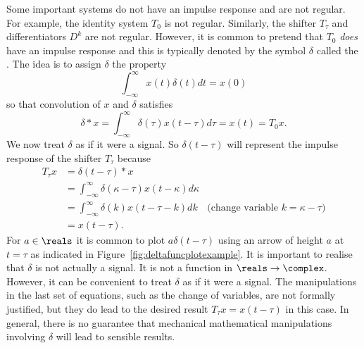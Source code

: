 Some important systems do not have an impulse response and are not regular.  For example, the identity system $T_0$ is not regular.  %
Similarly, the  shifter $T_\tau$ and differentiators $D^k$ are not regular.  However, it is common to pretend that $T_0$ \emph{does} have an impulse response and this is typically denoted by the symbol $\delta$ called the .  The idea is to assign $\delta$ the property
\[
\int_{-\infty}^\infty x(t) \delta(t) dt = x(0) %
\]
so that convolution of $x$ and $\delta$ satisfies
\[
\delta * x = \int_{-\infty}^{\infty} \delta(\tau) x(t - \tau) d\tau = x(t) = T_0 x .
\]
We now treat $\delta$ as if it were a signal.  So $\delta(t - \tau)$ will represent the impulse response of the shifter $T_\tau$ because
\begin{align*}
T_\tau x &= \delta(t - \tau) * x \\
&= \int_{-\infty}^{\infty} \delta(\kappa -\tau) x(t - \kappa) d\kappa \\
&= \int_{-\infty}^{\infty} \delta(k) x(t - \tau - k) dk & \text{(change variable $k = \kappa - \tau$)}\\
&= x(t-\tau).
\end{align*}
For $a \in \reals$ it is common to plot $a\delta(t - \tau)$ using an arrow of height $a$ at $t = \tau$ as indicated in Figure~\ref{fig:deltafuncplotexample}.  It is important to realise that $\delta$ is not actually a signal.  It is not a function in $\reals \to \complex$.  However, it can be convenient to treat $\delta$ as if it were a signal.  The manipulations in the last set of equations, such as the change of variables, are not formally justified, but they do lead to the desired result $T_\tau x = x(t-\tau)$ in this case.  In general, there is no guarantee that mechanical mathematical manipulations involving $\delta$ will lead to sensible results.

